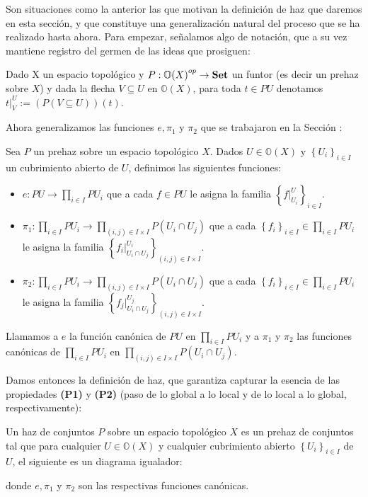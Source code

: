 Son situaciones como la anterior las que motivan la definición de haz que daremos en esta sección, y que constituye una generalización natural del proceso que se ha realizado hasta ahora. Para empezar, señalamos algo de notación, que a su vez mantiene registro del germen de las ideas que prosiguen:
\begin{Not}
Dado X un espacio topológico y ${P:\mathbb{O}(X)}^{op}\to\normalfont{\textbf{Set}}$ un funtor (es decir un prehaz sobre $X$) y dada la flecha $V\subseteq U$ en $\mathbb{O}(X)$, para toda $t\in PU$ denotamos $t|^{U}_{V}:=(P(V\subseteq U))(t)$.
\end{Not}
Ahora generalizamos las funciones $e,\pi_1$ y $\pi_2$ que se trabajaron en la Sección :
\begin{Def}
   Sea $P$ un prehaz sobre un espacio topológico $X$. Dados $U\in\mathbb{O}(X)$ y $\left\lbrace U_i\right\rbrace_{i\in I}$ un cubrimiento abierto de $U$, definimos las siguientes funciones:
   \begin{itemize}
      \item $e:PU\to \prod_{i\in I}PU_i$ que a cada $f\in PU$ le asigna la familia $\left\lbrace f|^{U}_{U_i}\right\rbrace_{i\in I}$.
      \item $\pi_1:\prod_{i\in I}PU_i\to \prod_{(i,j)\in I\times I}P(U_i\cap U_j)$ que a cada $\left\lbrace f_i\right\rbrace_{i\in I}\in\prod_{i\in I}PU_i$ le asigna la familia $\left\lbrace {f_i}|^{U_i}_{U_i\cap U_j}\right\rbrace_{(i,j)\in I\times I}$.
      \item $\pi_2:\prod_{i\in I}PU_i\to \prod_{(i,j)\in I\times I}P(U_i\cap U_j)$ que a cada $\left\lbrace f_i\right\rbrace_{i\in I}\in\prod_{i\in I}PU_i$ le asigna la familia $\left\lbrace {f_j}|^{U_j}_{U_i\cap U_j}\right\rbrace_{(i,j)\in I\times I}$.
   \end{itemize}
   Llamamos a $e$ la función canónica de $PU$ en $\prod_{i\in I}PU_i$ y a $\pi_1$ y $\pi_2$ las funciones canónicas de $\prod_{i\in I}PU_i$ en $\prod_{(i,j)\in I\times I}P(U_i\cap U_j)$.
\end{Def}
Damos entonces la definición de haz, que garantiza capturar la esencia de las propiedades \textbf{(P1)} y \textbf{(P2)} (paso de lo global a lo local y de lo local a lo global, respectivamente):
\begin{Def}
   Un haz de conjuntos $P$ sobre un espacio topológico $X$ es un prehaz de conjuntos tal que para cualquier $U\in \mathbb{O}(X)$ y cualquier cubrimiento abierto $\left\lbrace U_i\right\rbrace_{i\in I}$ de $U$, el siguiente es un diagrama igualador:
   
   donde $e,\pi_1$ y $\pi_2$ son las respectivas funciones canónicas.
\end{Def}
